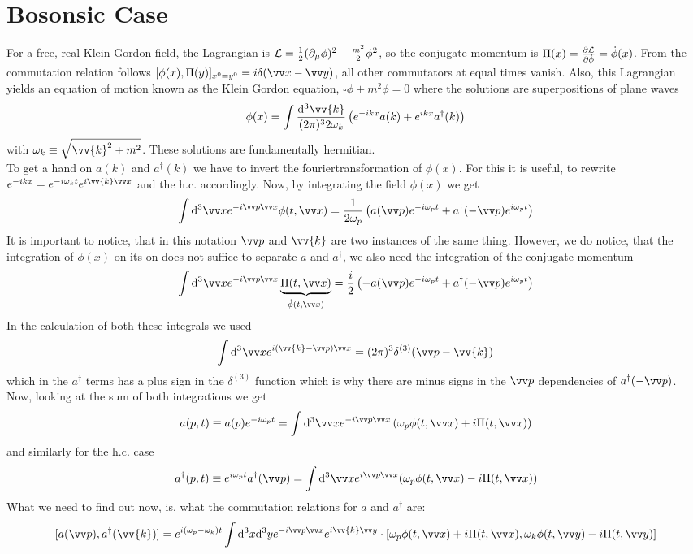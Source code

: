 \section{Bosonsic Case}
For a free, real Klein Gordon field, the Lagrangian is $\mathcal{L} = \frac{1}{2}( \partial_\mu \phi)^2 - \frac{m^2}{2} \phi^2$, so the conjugate momentum is $\Pi(x) = \frac{\partial \mathcal{L}}{\partial \dot{\phi}} = \dot{\phi}(x)$. From the commutation relation follows $[\phi(x), \Pi(y)]_{x^0=y^0} = i \delta( \vx-\vy)$, all other commutators at equal times vanish. Also, this Lagrangian yields an equation of motion known as the Klein Gordon equation, $\square \phi + m^2 \phi = 0$ where the solutions are superpositions of plane waves
\[ \phi(x) = \int \frac{\dd ^3 \vv{k}}{(2\pi)^3 2 \omega_k} \left( e^{-ikx}a(k) + e^{ikx}a^\dagger(k)\right)\]
with $\omega_k \equiv \sqrt{ \vv{k}^2 + m^2}$. These solutions are fundamentally hermitian.\\
To get a hand on $a(k)$ and $a^\dagger(k)$ we have to invert the fouriertransformation of $\phi(x)$. For this it is useful, to rewrite $e^{-ikx} = e^{-i\omega_kt}e^{i \vv{k}\vx}$ and the h.c. accordingly. Now, by integrating the field $\phi(x)$ we get
\[ \int \dd^3 \vx e^{-i\vp\vx}\phi(t, \vx) = \frac{1}{2\omega_p}\left( a(\vp) e^{-i\omega_p t} + a^\dagger(-\vp)e^{i \omega_p t}\right)\]
It is important to notice, that in this notation $\vp$ and $\vv{k}$ are two instances of the same thing. However, we do notice, that the integration of $\phi(x)$ on its on does not suffice to separate $a$ and $a^\dagger$, we also need the integration of the conjugate momentum
\[ \int \dd^3 \vx e^{-i \vp \vx} \underbrace{\Pi(t, \vx)}_{\dot{\phi}(t,\vx)} = \frac{i}{2} \left( - a (\vp) e^{-i \omega_p t} + a^\dagger(- \vp) e^{i \omega_p t}\right)\]
In the calculation of both these integrals we used
\[ \int \dd ^3 \vx e^{i(\vv{k} - \vp)\vx} = (2\pi)^3 \delta^{(3)}(\vp - \vv{k})\]
which in the $a^\dagger$ terms has a plus sign in the $\delta^{(3)}$ function which is why there are minus signs in the $\vp$ dependencies of $a^\dagger(-\vp)$. Now, looking at the sum of both integrations we get
\[ a(p,t) \equiv a(p) e^{-i\omega_p t} = \int \dd^3 \vx e^{-i \vp \vx} \left( \omega_p \phi(t, \vx) + i \Pi(t, \vx)\right)\]
and similarly for the h.c. case
\[ a^\dagger(p,t) \equiv e^{i \omega_p t} a^\dagger(\vp) = \int \dd^3 \vx e^{i \vp \vx} ( \omega_p \phi(t, \vx) - i \Pi(t, \vx) )\]
What we need to find out now, is, what the commutation relations for $a$ and $a^\dagger$ are:
\[ [a(\vp), a^\dagger( \vv{k}) ] = e^{i(\omega_p - \omega _k) t} \int \dd^3 x \dd^3 y e^{-i \vp \vx} e^{ i \vv{k} \vy} \cc [ \omega_p \phi(t, \vx) + i \Pi(t, \vx), \omega_k\phi(t, \vy) - i \Pi(t, \vy)]\]
